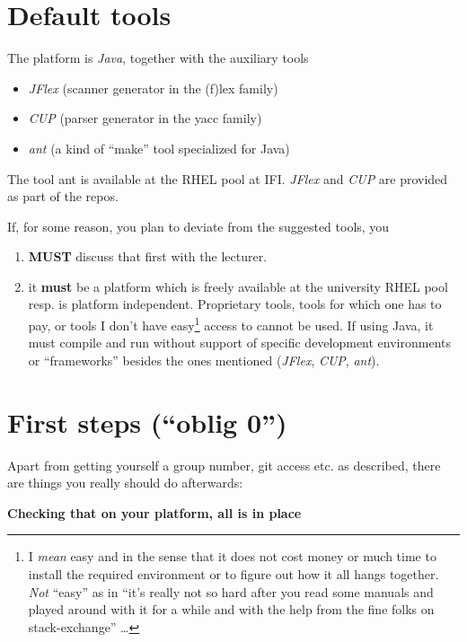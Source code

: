 \documentclass[10pt,freeform]{handout}[2014/08/13]
\begin{document}
\section{Default tools}

The platform is \emph{Java}, together with the auxiliary tools

\begin{itemize}
\item \textsl{JFlex} (scanner generator in the (f)lex family)
\item \textsl{CUP} (parser generator in the yacc family)
\item \textsl{ant} (a kind of ``make'' tool specialized for Java)
\end{itemize}


The tool ant is available at the RHEL pool at IFI. \textsl{JFlex} and
\textsl{CUP} are provided as part of the repos.

\bigskip 
If, for some reason, you plan to deviate from the suggested tools, you
\begin{enumerate}
\item \textbf{MUST} discuss that first with the lecturer.
\item it \textbf{must} be a platform which is freely available at the
  university RHEL pool resp. is platform independent. Proprietary tools,
  tools for which one has to pay, or tools I don't have easy\footnote{I
    \emph{mean} easy and in the sense that it does not cost money or much
    time to install the required environment or to figure out how it all
    hangs together. \emph{Not} ``easy'' as in ``it's really not so hard
    after you read some manuals and played around with it for a while and
    with the help from the fine folks on stack-exchange'' \ldots} access to
  cannot be used. If using Java, it must compile and run without support of
  specific development environments or ``frameworks'' besides the ones
  mentioned (\textsl{JFlex}, \textsl{CUP}, \textsl{ant}).
\end{enumerate}


\section{First steps (``oblig 0'')}
\label{sec:first-steps-oblig}

Apart from getting yourself a group number, git access etc. as described,
there are things you really should do afterwards:

\begin{center}
  \textbf{Checking that on your platform, all is in place}
\end{center}
\end{document}
